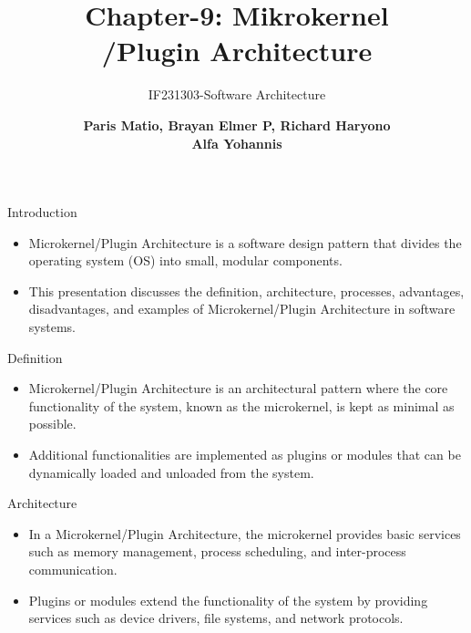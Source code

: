 \documentclass[aspectratio=169, table]{beamer}
\subtitle{IF231303-Software Architecture}
\title{\huge Chapter-9: Mikrokernel\\/Plugin Architecture}
\author[Pradita]{\small {\textbf{Paris Matio, Brayan Elmer P, Richard Haryono\\ Alfa Yohannis}}}
\begin{document}
	
	
	\begin{frame}[plain]
		\maketitle
	\end{frame}
	
	\begin{frame}{Introduction}
		\begin{itemize}
			\item Microkernel/Plugin Architecture is a software design pattern that divides the operating system (OS) into small, modular components.
			\item This presentation discusses the definition, architecture, processes, advantages, disadvantages, and examples of Microkernel/Plugin Architecture in software systems.
		\end{itemize}
	\end{frame}
	
	\begin{frame}{Definition}
		\begin{itemize}
			\item Microkernel/Plugin Architecture is an architectural pattern where the core functionality of the system, known as the microkernel, is kept as minimal as possible.
			\item Additional functionalities are implemented as plugins or modules that can be dynamically loaded and unloaded from the system.
		\end{itemize}
	\end{frame}
	
	\begin{frame}{Architecture}
		\begin{itemize}
			\item In a Microkernel/Plugin Architecture, the microkernel provides basic services such as memory management, process scheduling, and inter-process communication.
			\item Plugins or modules extend the functionality of the system by providing services such as device drivers, file systems, and network protocols.
		\end{itemize}
	\end{frame}
	
\end{document}
